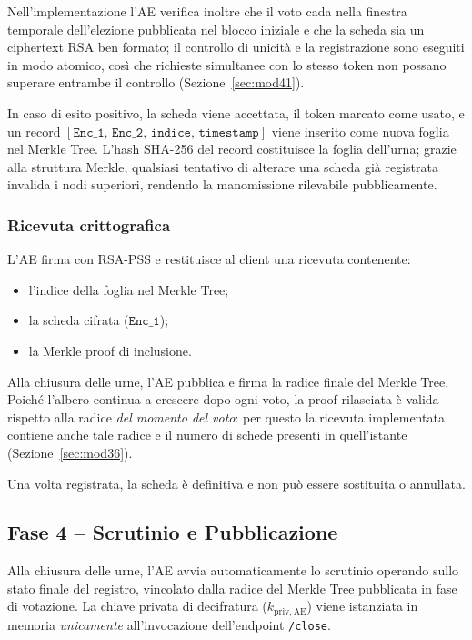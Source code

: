 \documentclass[12pt,a4paper]{article}
\begin{document}
Nell'implementazione l'AE verifica inoltre che il voto cada nella finestra temporale
dell'elezione pubblicata nel blocco iniziale e che la scheda sia un ciphertext RSA ben
formato; il controllo di unicità e la registrazione sono eseguiti in modo atomico, così che
richieste simultanee con lo stesso token non possano superare entrambe il controllo
(Sezione~\ref{sec:mod41}).

In caso di esito positivo, la scheda viene accettata, il token marcato come usato,
e un record $[\mathtt{Enc\_1},\, \mathtt{Enc\_2},\, \mathtt{indice},\, \mathtt{timestamp}]$
viene inserito come nuova foglia nel Merkle Tree. L'hash SHA-256 del record costituisce
la foglia dell'urna; grazie alla struttura Merkle, qualsiasi tentativo di alterare una
scheda già registrata invalida i nodi superiori, rendendo la manomissione rilevabile
pubblicamente.

\subsubsection{Ricevuta crittografica}

L'AE firma con RSA-PSS e restituisce al client una ricevuta contenente:
\begin{itemize}
  \item l'indice della foglia nel Merkle Tree;
  \item la scheda cifrata ($\mathtt{Enc\_1}$);
  \item la Merkle proof di inclusione.
\end{itemize}

Alla chiusura delle urne, l'AE pubblica e firma la radice finale del Merkle Tree. Poiché
l'albero continua a crescere dopo ogni voto, la proof rilasciata è valida rispetto alla
radice \emph{del momento del voto}: per questo la ricevuta implementata contiene anche tale
radice e il numero di schede presenti in quell'istante (Sezione~\ref{sec:mod36}).

Una volta registrata, la scheda è definitiva e non può essere sostituita o annullata.

\subsection{Fase 4 – Scrutinio e Pubblicazione}

Alla chiusura delle urne, l'AE avvia automaticamente lo scrutinio operando sullo stato
finale del registro, vincolato dalla radice del Merkle Tree pubblicata in fase di votazione.
La chiave privata di decifratura ($k_{\mathrm{priv,AE}}$) viene istanziata in memoria
\emph{unicamente} all'invocazione dell'endpoint \texttt{/close}.
\end{document}
